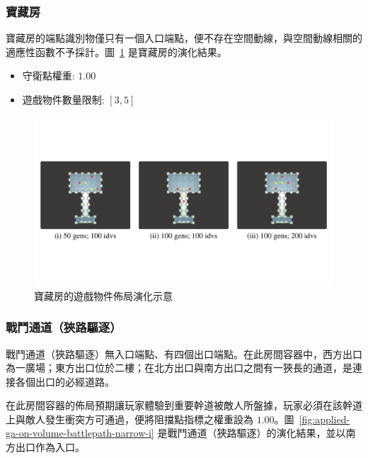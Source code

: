 \subsubsection{寶藏房}
\label{sssec:method-segments-appliedonvolumes-treasure}

寶藏房的端點識別物僅只有一個入口端點，便不存在空間動線，與空間動線相關的適應性函數不予採計。圖~\ref{fig:applied-ga-on-volume-treasure} 是寶藏房的演化結果。

\begin{itemize}
  \setlength\itemsep{-0.5em}
  \item 守衛點權重: $1.00$
  \item 遊戲物件數量限制: $[3, 5]$
\end{itemize}

\begin{figure}[H]
  \begin{center}
    \includegraphics[width=1.0\textwidth]{figures/applied-ga-on-volume-treasure.pdf}
    \caption{寶藏房的遊戲物件佈局演化示意} 
    \label{fig:applied-ga-on-volume-treasure}
  \end{center}
\end{figure}

\subsubsection{戰鬥通道（狹路驅逐）}
\label{sssec:method-segments-appliedonvolumes-battlepath-narrow}

戰鬥通道（狹路驅逐）無入口端點、有四個出口端點。在此房間容器中，西方出口為一廣場；東方出口位於二樓；在北方出口與南方出口之間有一狹長的通道，是連接各個出口的必經道路。

在此房間容器的佈局預期讓玩家體驗到重要幹道被敵人所盤據，玩家必須在該幹道上與敵人發生衝突方可通過，便將阻擋點指標之權重設為 $1.00$。圖~\ref{fig:applied-ga-on-volume-battlepath-narrow-i} 是戰鬥通道（狹路驅逐）的演化結果，並以南方出口作為入口。

